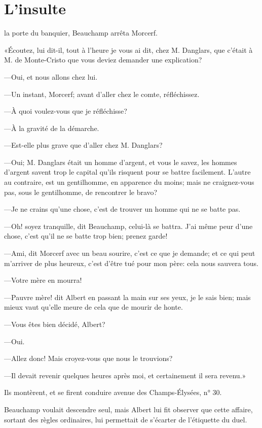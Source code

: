 \chapter{L'insulte} 

\lettrine{}{} la porte du banquier, Beauchamp arrêta Morcerf. 

\zz
«Écoutez, lui dit-il, tout à l'heure je vous ai dit, chez M. Danglars, que c'était à M. de Monte-Cristo que vous deviez demander une explication? 

—Oui, et nous allons chez lui. 

—Un instant, Morcerf; avant d'aller chez le comte, réfléchissez. 

—À quoi voulez-vous que je réfléchisse? 

—À la gravité de la démarche. 

—Est-elle plus grave que d'aller chez M. Danglars? 

—Oui; M. Danglars était un homme d'argent, et vous le savez, les hommes d'argent savent trop le capital qu'ils risquent pour se battre facilement. L'autre au contraire, est un gentilhomme, en apparence du moins; mais ne craignez-vous pas, sous le gentilhomme, de rencontrer le bravo? 

—Je ne crains qu'une chose, c'est de trouver un homme qui ne se batte pas. 

—Oh! soyez tranquille, dit Beauchamp, celui-là se battra. J'ai même peur d'une chose, c'est qu'il ne se batte trop bien; prenez garde! 

—Ami, dit Morcerf avec un beau sourire, c'est ce que je demande; et ce qui peut m'arriver de plus heureux, c'est d'être tué pour mon père: cela nous sauvera tous. 

—Votre mère en mourra! 

—Pauvre mère! dit Albert en passant la main sur ses yeux, je le sais bien; mais mieux vaut qu'elle meure de cela que de mourir de honte. 

—Vous êtes bien décidé, Albert? 

—Oui. 

—Allez donc! Mais croyez-vous que nous le trouvions? 

—Il devait revenir quelques heures après moi, et certainement il sera revenu.» 

Ils montèrent, et se firent conduire avenue des Champs-Élysées, n° 30. 

Beauchamp voulait descendre seul, mais Albert lui fit observer que cette affaire, sortant des règles ordinaires, lui permettait de s'écarter de l'étiquette du duel. 

